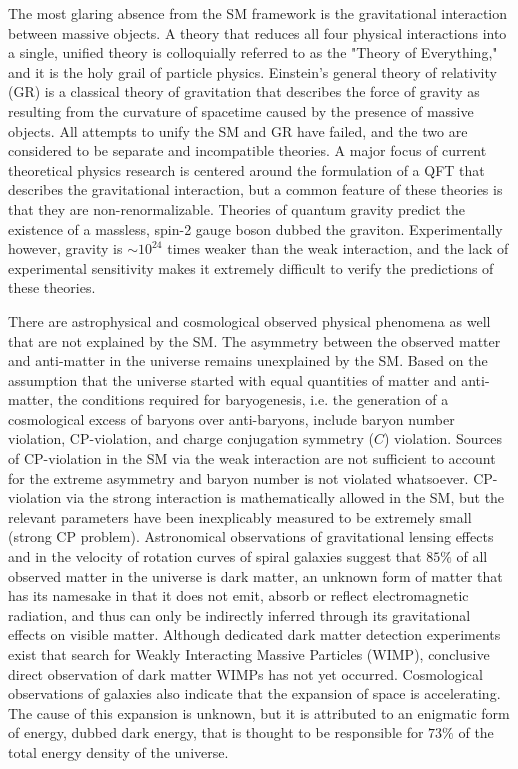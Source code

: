 The most glaring absence from the SM framework is the gravitational interaction between massive objects.
A theory that reduces all four physical interactions into a single, unified theory is colloquially referred to as the "Theory of Everything," and it is the holy grail of particle physics.
Einstein's general theory of relativity (GR) is a classical theory of gravitation that describes the force of gravity as resulting from the curvature of spacetime caused by the presence of massive objects.
All attempts to unify the SM and GR have failed, and the two are considered to be separate and incompatible theories.
A major focus of current theoretical physics research is centered around the formulation of a QFT that describes the gravitational interaction, but a common feature of these theories is that they are non-renormalizable.
Theories of quantum gravity predict the existence of a massless, spin-2 gauge boson dubbed the graviton.
Experimentally however, gravity is $\sim 10^{24}$ times weaker than the weak interaction, and the lack of experimental sensitivity makes it extremely difficult to verify the predictions of these theories.

There are astrophysical and cosmological observed physical phenomena as well that are not explained by the SM.
The asymmetry between the observed matter and anti-matter in the universe remains unexplained by the SM.
Based on the assumption that the universe started with equal quantities of matter and anti-matter, the conditions required for baryogenesis, i.e. the generation of a cosmological excess of baryons over anti-baryons, include baryon number violation, CP-violation, and charge conjugation symmetry ($C$) violation.
Sources of CP-violation in the SM via the weak interaction are not sufficient to account for the extreme asymmetry and baryon number is not violated whatsoever.
CP-violation via the strong interaction is mathematically allowed in the SM, but the relevant parameters have been inexplicably measured to be extremely small (strong CP problem).
Astronomical observations of gravitational lensing effects and in the velocity of rotation curves of spiral galaxies suggest that $85 \%$ of all observed matter in the universe is dark matter, an unknown form of matter that has its namesake in that it does not emit, absorb or reflect electromagnetic radiation, and thus can only be indirectly inferred through its gravitational effects on visible matter.
Although dedicated dark matter detection experiments exist that search for Weakly Interacting Massive Particles (WIMP), conclusive direct observation of dark matter WIMPs has not yet occurred.
Cosmological observations of galaxies also indicate that the expansion of space is accelerating.
The cause of this expansion is unknown, but it is attributed to an enigmatic form of energy, dubbed dark energy, that is thought to be responsible for $73 \%$ of the total energy density of the universe.

